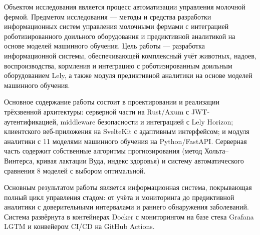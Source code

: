 \abstract


Объектом исследования является процесс автоматизации управления молочной фермой. Предметом исследования --- методы и средства разработки информационных систем управления молочными фермами с интеграцией роботизированного доильного оборудования и предиктивной аналитикой на основе моделей машинного обучения. Цель работы --- разработка информационной системы, обеспечивающей комплексный учёт животных, надоев, воспроизводства, кормления и интеграцию с роботизированным доильным оборудованием Lely, а также модуля предиктивной аналитики на основе моделей машинного обучения.

Основное содержание работы состоит в проектировании и реализации трёхзвенной архитектуры: серверной части на Rust/Axum с JWT-аутентификацией, middleware безопасности и интеграцией с Lely Horizon; клиентского веб-приложения на SvelteKit с адаптивным интерфейсом; и модуля аналитики с 11 моделями машинного обучения на Python/FastAPI. Серверная часть содержит собственные алгоритмы прогнозирования (метод Хольта--Винтерса, кривая лактации Вуда, индекс здоровья) и систему автоматического сравнения 8 моделей с выбором оптимальной.

Основным результатом работы является информационная система, покрывающая полный цикл управления стадом: от учёта и мониторинга до предиктивной аналитики с доверительными интервалами и раннего обнаружения заболеваний. Система развёрнута в контейнерах Docker с мониторингом на базе стека Grafana LGTM и конвейером CI/CD на GitHub Actions.
